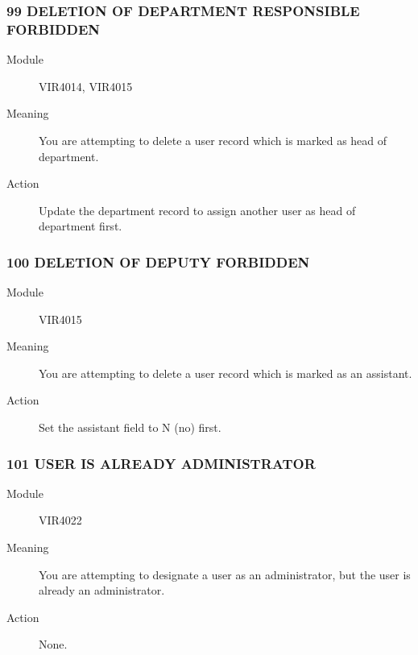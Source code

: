 \documentclass[letterpaper,10pt,english]{sphinxmanual}
\begin{document}
\subsubsection{99 DELETION OF DEPARTMENT RESPONSIBLE FORBIDDEN}
\label{\detokenize{messages:deletion-of-department-responsible-forbidden}}\begin{description}
\item[{Module}] \leavevmode
VIR4014, VIR4015

\item[{Meaning}] \leavevmode
You are attempting to delete a user record which is marked as head of department.

\item[{Action}] \leavevmode
Update the department record to assign another user as head of department first.

\end{description}


\subsubsection{100 DELETION OF DEPUTY FORBIDDEN}
\label{\detokenize{messages:deletion-of-deputy-forbidden}}\begin{description}
\item[{Module}] \leavevmode
VIR4015

\item[{Meaning}] \leavevmode
You are attempting to delete a user record which is marked as an assistant.

\item[{Action}] \leavevmode
Set the assistant field to N (no) first.

\end{description}


\subsubsection{101 USER IS ALREADY ADMINISTRATOR}
\label{\detokenize{messages:user-is-already-administrator}}\begin{description}
\item[{Module}] \leavevmode
VIR4022

\item[{Meaning}] \leavevmode
You are attempting to designate a user as an administrator, but the user is already an administrator.

\item[{Action}] \leavevmode
None.

\end{description}
\end{document}
